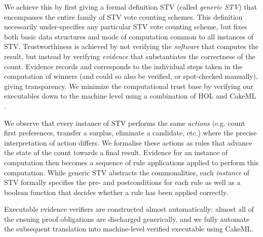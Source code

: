 \documentclass[10pt,conference]{IEEEtran}
\begin{document}

We achieve this by first giving a formal definition STV (called \emph{generic STV}) 
that  encompasses the entire family of STV vote counting
schemes. This definition necessarily under-specifies any particular STV vote counting scheme, but fixes both basic data structures and mode of computation common to all instances of STV. Trustworthiness is achieved by
not verifying the \emph{software} that computes the result, but instead by verifying \emph{evidence} that substantiates the correctness of the count. Evidence records and corresponds to the individual steps taken in the computation of winners 
(and could so also be verified, or spot-checked manually), giving transparency. We minimize the computational trust base by verifying our executables down to the machine level using a combination of HOL \cite{hol} and CakeML \cite{cake}. 

We observe that every instance of STV performs the same \emph{actions} (e.g. count first preferences, transfer a surplus, eliminate a candidate, etc.) where the precise interpretation of action differs. We formalise these actions as rules that advance the state of the count towards a final result. Evidence for an instance of computation then becomes a sequence of rule applications applied to perform this computation. While generic STV abstracts the commonalities, each \emph{instance} of STV formally specifies the
pre- and postconditions for each rule as well as a boolean function that decides whether a rule has been applied correctly. 

Executable evidence verifiers are constructed almost
automatically:  almost all of the ensuing proof obligations are discharged generically, and we fully  automate the subsequent translation into machine-level verified executable using CakeML.
\end{document}
